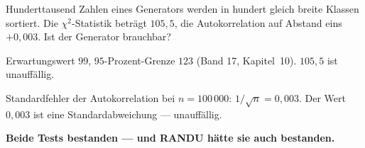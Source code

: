\begin{aufgabe}
Hunderttausend Zahlen eines Generators werden in hundert gleich breite Klassen sortiert. Die $\chi^{2}$-Statistik beträgt $105{,}5$, die Autokorrelation auf Abstand eins $+0{,}003$. Ist der Generator brauchbar?

\loesung
{}
Erwartungswert $99$, $95$-Prozent-Grenze $123$ (Band 17, Kapitel~10). $105{,}5$ ist unauffällig.

Standardfehler der Autokorrelation bei $n = 100\,000$: $1/\sqrt n = 0{,}003$. Der Wert $0{,}003$ ist eine Standardabweichung --- unauffällig.

\begin{center}
\begin{minipage}{0.9\textwidth}
\textbf{Beide Tests bestanden --- und RANDU hätte sie auch bestanden.}
\end{minipage}
\end{center}

\begin{center}
\begin{minipage}{0.88\textwidth}
\end{minipage}
\end{center}
\end{aufgabe}

